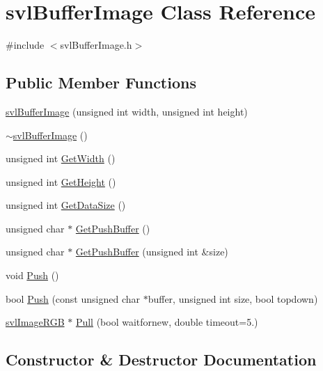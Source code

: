 \hypertarget{classsvl_buffer_image}{}\section{svl\+Buffer\+Image Class Reference}
\label{classsvl_buffer_image}


{\ttfamily \#include $<$svl\+Buffer\+Image.\+h$>$}

\subsection*{Public Member Functions}
\begin{DoxyCompactItemize}
\item 
\hyperlink{classsvl_buffer_image_a6aee8b84561c7057dc92920c726f2b85}{svl\+Buffer\+Image} (unsigned int width, unsigned int height)
\item 
\hyperlink{classsvl_buffer_image_a3e0f56b816e77b910b4065e7355c2884}{$\sim$svl\+Buffer\+Image} ()
\item 
unsigned int \hyperlink{classsvl_buffer_image_a537ec231c13aa6329095b8ffae4bffa8}{Get\+Width} ()
\item 
unsigned int \hyperlink{classsvl_buffer_image_a7151eafe04f4591450cdf95d9b1591d1}{Get\+Height} ()
\item 
unsigned int \hyperlink{classsvl_buffer_image_a3381fd120533dabb59b0dd6c086f24a4}{Get\+Data\+Size} ()
\item 
unsigned char $\ast$ \hyperlink{classsvl_buffer_image_a654e6fab4be31c9b721520be57bed675}{Get\+Push\+Buffer} ()
\item 
unsigned char $\ast$ \hyperlink{classsvl_buffer_image_a9a05956d6d5ea74486e456aaab99a84d}{Get\+Push\+Buffer} (unsigned int \&size)
\item 
void \hyperlink{classsvl_buffer_image_a0749b519d476e542bb4ee2f47d1bf7a0}{Push} ()
\item 
bool \hyperlink{classsvl_buffer_image_ae2b2c23f7f3efeea69879089ce031cc3}{Push} (const unsigned char $\ast$buffer, unsigned int size, bool topdown)
\item 
\hyperlink{svl_types_8h_a7b03c3d61bbbbf8fe59585453969d250}{svl\+Image\+R\+G\+B} $\ast$ \hyperlink{classsvl_buffer_image_a3477386b9671df79ae53f740c1d13170}{Pull} (bool waitfornew, double timeout=5.)
\end{DoxyCompactItemize}


\subsection{Constructor \& Destructor Documentation}
\hypertarget{classsvl_buffer_image_a6aee8b84561c7057dc92920c726f2b85}{}
